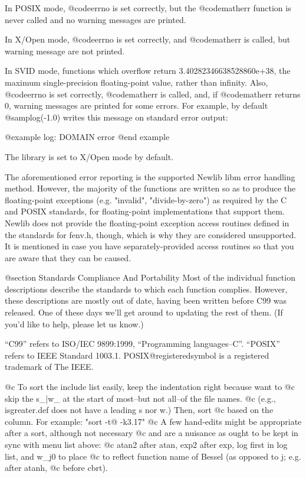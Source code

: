 In POSIX mode, @code{errno} is set correctly, but the @code{matherr}
function is never called and no warning messages are printed.

In X/Open mode, @code{errno} is set correctly, and @code{matherr} is
called, but warning message are not printed.

In SVID mode, functions which overflow return 3.40282346638528860e+38,
the maximum single-precision floating-point value, rather than infinity.
Also, @code{errno} is set correctly, @code{matherr} is called, and, if
@code{matherr} returns 0, warning messages are printed for some errors.
For example, by default @samp{log(-1.0)} writes this message on standard
error output:

@example
log: DOMAIN error
@end example

The library is set to X/Open mode by default.

The aforementioned error reporting is the supported Newlib libm error
handling method.  However, the majority of the functions are written
so as to produce the floating-point exceptions (e.g. "invalid",
"divide-by-zero") as required by the C and POSIX standards, for
floating-point implementations that support them.  Newlib does not provide
the floating-point exception access routines defined in the standards
for fenv.h, though, which is why they are considered unsupported.  It is
mentioned in case you have separately-provided access routines so that
you are aware that they can be caused.

@section Standards Compliance And Portability
Most of the individual function descriptions describe the standards to which
each function complies.  However, these descriptions are mostly out of date,
having been written before C99 was released.  One of these days we'll get
around to updating the rest of them.  (If you'd like to help, please let us
know.)

``C99'' refers to ISO/IEC 9899:1999, ``Programming languages--C''.
``POSIX'' refers to IEEE Standard 1003.1.  POSIX@registeredsymbol{} is a
registered trademark of The IEEE.

@c To sort the include list easily, keep the indentation right because want to
@c skip the s_|w_ at the start of most--but not all--of the file names.
@c (e.g., isgreater.def does not have a leading s nor w.)  Then, sort
@c based on the column.  For example:  "sort -t@ -k3.17"
@c A few hand-edits might be appropriate after a sort, although not necessary
@c and are a nuisance as ought to be kept in sync with menu list above:
@c atan2 after atan, exp2 after exp, log first in log list, and w_j0 to place
@c to reflect function name of Bessel (as opposed to j; e.g. after atanh,
@c before cbrt).

